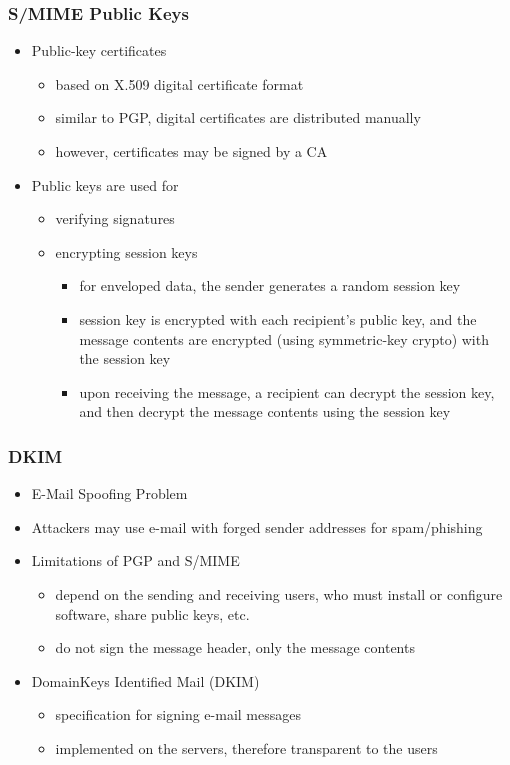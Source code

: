 \documentclass[final]{article}
\begin{document}
\subsubsection*{S/MIME Public Keys}
\begin{itemize}[nosep]
    \item Public-key certificates
          \begin{itemize}[nosep]
              \item based on X.509 digital certificate format
              \item similar to PGP, digital certificates are distributed manually
              \item however, certificates may be signed by a CA
          \end{itemize}
    \item Public keys are used for
          \begin{itemize}[nosep]
              \item verifying signatures
              \item encrypting session keys
                    \begin{itemize}[nosep]
                        \item for enveloped data, the sender generates a random session key
                        \item session key is encrypted with each recipient’s public key, and the message contents are encrypted (using symmetric-key crypto) with the session key
                        \item upon receiving the message, a recipient can decrypt the session key, and then decrypt the message contents using the session key
                    \end{itemize}
          \end{itemize}
\end{itemize}
\subsubsection*{DKIM}
\begin{itemize}
    \item E-Mail Spoofing Problem
    \item Attackers may use e-mail with forged sender addresses for spam/phishing
    \item Limitations of PGP and S/MIME
          \begin{itemize}[nosep]
              \item depend on the sending and receiving users, who must install or configure software, share public keys, etc.
              \item do not sign the message header, only the message contents
          \end{itemize}
    \item DomainKeys Identified Mail (DKIM)
          \begin{itemize}[nosep]
              \item specification for signing e-mail messages
              \item implemented on the servers, therefore transparent to the users
          \end{itemize}
\end{itemize}
\end{document}
